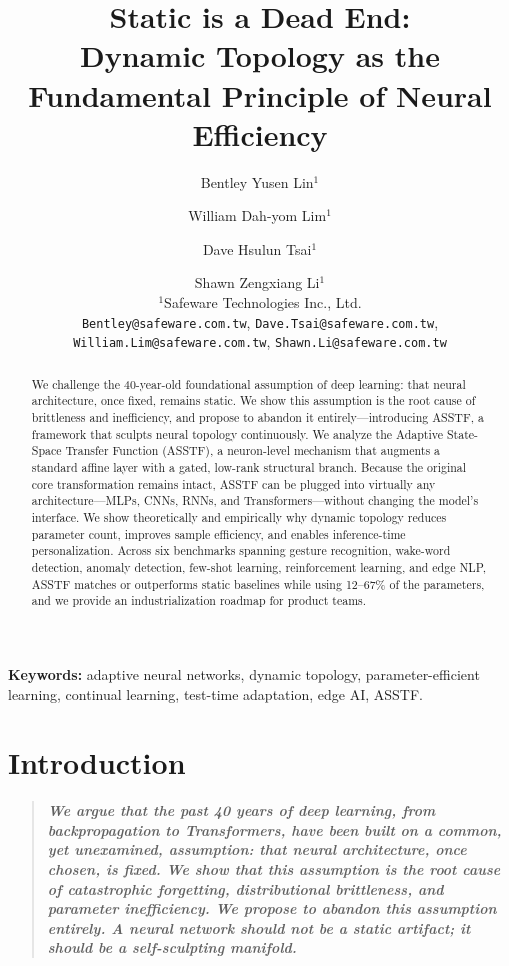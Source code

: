 \documentclass[11pt,a4paper]{article}
\title{\textbf{Static is a Dead End:}\\[0.3em]
\Large Dynamic Topology as the Fundamental Principle of Neural Efficiency}
\author{
Bentley Yusen Lin$^{1}$ \and William Dah-yom Lim$^{1}$ \and Dave Hsulun Tsai$^{1}$ \and Shawn Zengxiang Li$^{1}$\\[0.5em]
\normalsize $^{1}$Safeware Technologies Inc., Ltd.\\[0.2em]
\normalsize \texttt{Bentley@safeware.com.tw}, \texttt{Dave.Tsai@safeware.com.tw},\\
\normalsize \texttt{William.Lim@safeware.com.tw}, \texttt{Shawn.Li@safeware.com.tw}
}
\date{}
\theoremstyle{definition}
\begin{document}
\maketitle

\begin{abstract}
We challenge the 40-year-old foundational assumption of deep learning: that neural architecture, once fixed, remains static. We show this assumption is the root cause of brittleness and inefficiency, and propose to abandon it entirely---introducing ASSTF, a framework that sculpts neural topology continuously. We analyze the Adaptive State-Space Transfer Function (ASSTF), a neuron-level mechanism that augments a standard affine layer with a gated, low-rank structural branch. Because the original core transformation remains intact, ASSTF can be plugged into virtually any architecture---MLPs, CNNs, RNNs, and Transformers---without changing the model's interface. We show theoretically and empirically why dynamic topology reduces parameter count, improves sample efficiency, and enables inference-time personalization. Across six benchmarks spanning gesture recognition, wake-word detection, anomaly detection, few-shot learning, reinforcement learning, and edge NLP, ASSTF matches or outperforms static baselines while using 12--67\% of the parameters, and we provide an industrialization roadmap for product teams.
\end{abstract}

\textbf{Keywords:} adaptive neural networks, dynamic topology, parameter-efficient learning, continual learning, test-time adaptation, edge AI, ASSTF.

\section{Introduction}
\label{sec:intro}

\begin{quote}
\itshape\bfseries
We argue that the past 40 years of deep learning, from backpropagation to Transformers, have been built on a common, yet unexamined, assumption: that neural architecture, once chosen, is fixed. We show that this assumption is the root cause of catastrophic forgetting, distributional brittleness, and parameter inefficiency. We propose to abandon this assumption entirely. A neural network should not be a static artifact; it should be a self-sculpting manifold.
\end{quote}
\end{document}
